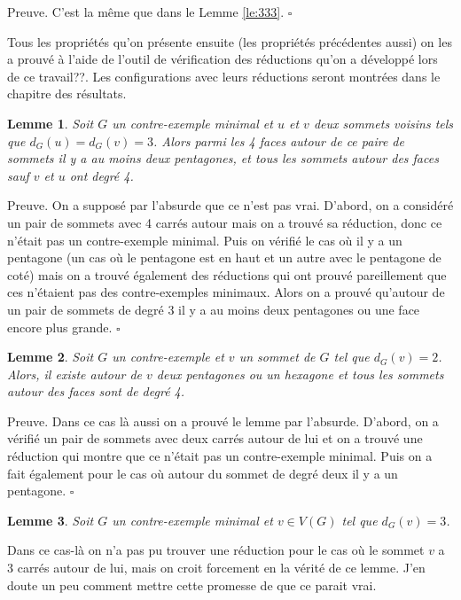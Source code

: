 \documentclass[10pt,a4paper]{article}
\newtheorem{lemme}{Lemme}
\newcommand{\ep}{{\hfill $\square$}}
\begin{document}
Preuve.
C'est la même que dans le Lemme \ref{le:333}.
\ep

Tous les propriétés qu'on présente ensuite (les propriétés précédentes aussi) on les a prouvé à l'aide de l'outil de vérification des réductions qu'on a développé lors de ce {\color{blue}travail??}. Les configurations avec leurs réductions seront montrées dans le chapitre des résultats.

\begin{lemme}
Soit $G$ un contre-exemple minimal et $u$ et $v$ deux sommets voisins tels que $d_G(u)=d_G(v) = 3$. Alors parmi les 4 faces autour de ce paire de sommets il y a au moins deux pentagones, et tous les sommets autour des faces sauf $v$ et $u$ ont degré 4.
\label{le:33pent}
\end{lemme}

Preuve.
On a supposé par l'absurde que ce n'est pas vrai. D'abord, on a considéré un pair de sommets avec 4 carrés autour mais on a trouvé sa réduction, donc ce n'était pas un contre-exemple minimal. Puis on vérifié le cas où il y a un pentagone (un cas où le pentagone est en haut et un autre avec le pentagone de coté) mais on a trouvé également des réductions qui ont prouvé pareillement que ces n'étaient pas des contre-exemples minimaux. Alors on a prouvé qu'autour de un pair de sommets de degré 3 il y a au moins deux pentagones ou une face encore plus grande.
\ep

\begin{lemme}
Soit $G$ un contre-exemple et $v$ un sommet de $G$ tel que $d_G(v) = 2$. Alors, il existe autour de $v$ deux pentagones ou un hexagone et tous les sommets autour des faces sont de degré 4.
\label{le:2pent}
\end{lemme}

Preuve.
Dans ce cas là aussi on a prouvé le lemme par l'absurde. D'abord, on a vérifié un pair de sommets avec deux carrés autour de lui et on a trouvé une réduction qui montre que ce n'était pas un contre-exemple minimal. Puis on a fait également pour le cas où autour du sommet de degré deux il y a un pentagone.
\ep

\begin{lemme}
Soit $G$ un contre-exemple minimal et $v \in V(G)$ tel que $d_G(v) = 3$.
\label{le:3}
\end{lemme}

Dans ce cas-là on n'a pas pu trouver une réduction pour le cas où le sommet $v$ a 3 carrés autour de lui, mais on croit forcement en la vérité de ce lemme.{\color{blue} J'en doute un peu comment mettre cette promesse de que ce parait vrai}.
\end{document}

